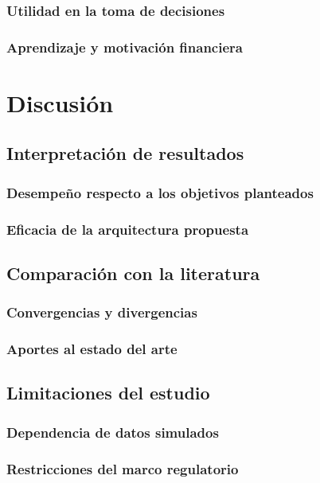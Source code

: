 \documentclass[
	spanish, %
	letterpaper, oneside
]{book}
\begin{document}
\begin{itemize}
\subsection{Utilidad en la toma de decisiones}
\subsection{Aprendizaje y motivación financiera}


\chapter{Discusión}

\section{Interpretación de resultados}
\subsection{Desempeño respecto a los objetivos planteados}
\subsection{Eficacia de la arquitectura propuesta}

\section{Comparación con la literatura}
\subsection{Convergencias y divergencias}
\subsection{Aportes al estado del arte}

\section{Limitaciones del estudio}
\subsection{Dependencia de datos simulados}
\subsection{Restricciones del marco regulatorio}

\end{itemize}
\end{document}

